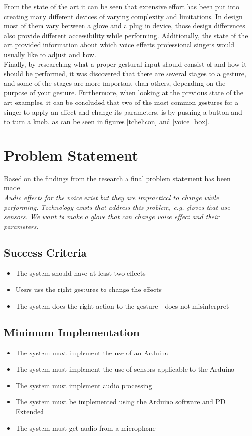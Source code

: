 From the state of the art it can be seen that extensive effort has been put into creating many different devices of varying complexity and limitations. In design most of them vary between a glove and a plug in device, those design differences also provide different accessibility while performing.
Additionally, the state of the art provided information about which voice effects professional singers would usually like to adjust and how.\\

Finally, by researching what a proper gestural input should consist of and how it should be performed, it was discovered that there are several stages to a gesture, and some of the stages are more important than others, depending on the purpose of your gesture.
Furthermore, when looking at the previous state of the art examples, it can be concluded that two of the most common gestures for a singer to apply an effect and change its parameters, is by pushing a button and to turn a knob, as can be seen in figures \ref{tchelicon} and \ref{voice_box}.

\section{Problem Statement}

Based on the findings from the research a final problem statement has been made:\\

\textit{Audio effects for the voice exist but they are impractical to change while performing. Technology exists that address this problem, e.g. gloves that use sensors. We want to make a glove that can change voice effect and their parameters.}

\subsection{Success Criteria}

\begin{itemize}
	\item The system should have at least two effects
	\item Users use the right gestures to change the effects
	\item The system does the right action to the gesture - does not misinterpret 
\end{itemize}



\subsection{Minimum Implementation}
\begin{itemize}
	\item The system must implement the use of an Arduino
	\item The system must implement the use of sensors applicable to the Arduino
	\item The system must implement audio processing
	\item The system must be implemented using the Arduino software and PD Extended
	\item The system must get audio from a microphone
\end{itemize}

